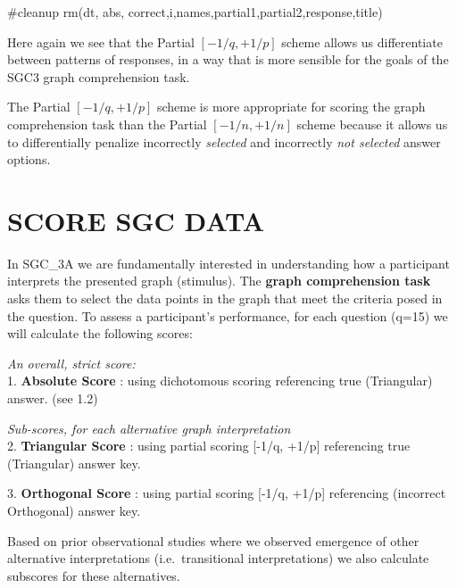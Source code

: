 \documentclass[
  letterpaper,
  DIV=11,
  numbers=noendperiod]{scrreprt}
\newenvironment{Shaded}{\begin{snugshade}}{\end{snugshade}}
\newcommand{\CommentTok}[1]{\textcolor[rgb]{0.37,0.37,0.37}{#1}}
\newcommand{\FunctionTok}[1]{\textcolor[rgb]{0.28,0.35,0.67}{#1}}
\newcommand{\NormalTok}[1]{\textcolor[rgb]{0.00,0.23,0.31}{#1}}
\begin{document}
\begin{Shaded}
\begin{Highlighting}[]
\CommentTok{\#cleanup}
\FunctionTok{rm}\NormalTok{(dt, abs, correct,i,names,partial1,partial2,response,title)}
\end{Highlighting}
\end{Shaded}

Here again we see that the Partial \([-1/q, +1/p]\) scheme allows us
differentiate between patterns of responses, in a way that is more
sensible for the goals of the SGC3 graph comprehension task.

\begin{tcolorbox}[enhanced jigsaw, opacityback=0, toprule=.15mm, colframe=quarto-callout-color-frame, breakable, leftrule=.75mm, rightrule=.15mm, bottomrule=.15mm, arc=.35mm, colback=white, left=2mm]
The Partial \([-1/q, +1/p]\) scheme is more appropriate for scoring the
graph comprehension task than the Partial \([-1/n, +1/n]\) scheme
because it allows us to differentially penalize incorrectly
\emph{selected} and incorrectly \emph{not selected} answer options.
\end{tcolorbox}

\hypertarget{score-sgc-data}{%
\section{SCORE SGC DATA}\label{score-sgc-data}}

In SGC\_3A we are fundamentally interested in understanding how a
participant interprets the presented graph (stimulus). The \textbf{graph
comprehension task} asks them to select the data points in the graph
that meet the criteria posed in the question. To assess a participant's
performance, for each question (q=15) we will calculate the following
scores:

\emph{An overall, strict score:}\\
1. \textbf{Absolute Score} : using dichotomous scoring referencing true
(Triangular) answer. (see 1.2)

\emph{Sub-scores, for each alternative graph interpretation}\\
2. \textbf{Triangular Score} : using partial scoring {[}-1/q, +1/p{]}
referencing true (Triangular) answer key.

3. \textbf{Orthogonal Score} : using partial scoring {[}-1/q, +1/p{]}
referencing (incorrect Orthogonal) answer key.

Based on prior observational studies where we observed emergence of
other alternative interpretations (i.e.~transitional interpretations) we
also calculate subscores for these alternatives.
\end{document}
